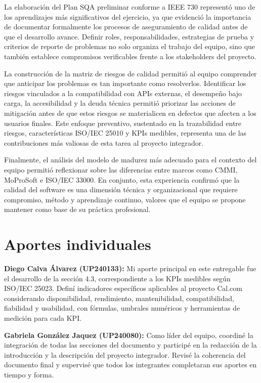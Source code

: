 \documentclass{article}
\begin{document}
La elaboración del Plan SQA preliminar conforme a IEEE 730 representó uno de los aprendizajes más significativos del ejercicio, ya que evidenció la importancia de documentar formalmente los procesos de aseguramiento de calidad antes de que el desarrollo avance. Definir roles, responsabilidades, estrategias de prueba y criterios de reporte de problemas no solo organiza el trabajo del equipo, sino que también establece compromisos verificables frente a los stakeholders del proyecto.

La construcción de la matriz de riesgos de calidad permitió al equipo comprender que anticipar los problemas es tan importante como resolverlos. Identificar los riesgos vinculados a la compatibilidad con APIs externas, el desempeño bajo carga, la accesibilidad y la deuda técnica permitió priorizar las acciones de mitigación antes de que estos riesgos se materialicen en defectos que afecten a los usuarios finales. Este enfoque preventivo, sustentado en la trazabilidad entre riesgos, características ISO/IEC 25010 y KPIs medibles, representa una de las contribuciones más valiosas de esta tarea al proyecto integrador.

Finalmente, el análisis del modelo de madurez más adecuado para el contexto del equipo permitió reflexionar sobre las diferencias entre marcos como CMMI, MoProSoft e ISO/IEC 33000. En conjunto, esta experiencia confirmó que la calidad del software es una dimensión técnica y organizacional que requiere compromiso, método y aprendizaje continuo, valores que el equipo se propone mantener como base de su práctica profesional.

\newpage
\section{Aportes individuales}

\textbf{Diego Calva Álvarez (UP240133):} Mi aporte principal en este entregable fue el desarrollo de la sección 4.3, correspondiente a los KPIs medibles según ISO/IEC 25023. Definí indicadores específicos aplicables al proyecto Cal.com considerando disponibilidad, rendimiento, mantenibilidad, compatibilidad, fiabilidad y usabilidad, con fórmulas, umbrales numéricos y herramientas de medición para cada KPI.

\textbf{Gabriela González Jaquez (UP240080):} Como líder del equipo, coordiné la integración de todas las secciones del documento y participé en la redacción de la introducción y la descripción del proyecto integrador. Revisé la coherencia del documento final y supervisé que todos los integrantes completaran sus aportes en tiempo y forma.
\end{document}
